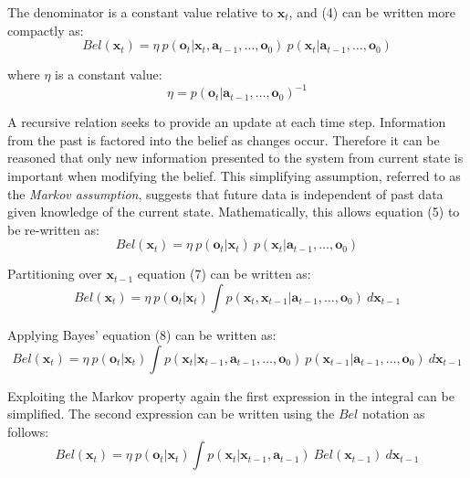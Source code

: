 \documentclass[a4paper]{article}
\begin{document}
The denominator is a constant value relative to $\mathbf{x}_t$, and (4) can be written more compactly as:
\begin{equation}
Bel(\mathbf{x}_t) = \eta \ p(\mathbf{o}_t | \mathbf{x}_t,\mathbf{a}_{t-1},\ldots,\mathbf{o}_0) \ p(\mathbf{x}_t | \mathbf{a}_{t-1},\ldots,\mathbf{o}_0)
\end{equation}

where $\eta$ is a constant value:
\begin{equation}
\eta = p(\mathbf{o}_t | \mathbf{a}_{t-1},\ldots,\mathbf{o}_0)^{-1}
\end{equation}

A recursive relation seeks to provide an update at each time step. Information from the past is factored into the belief as changes occur. Therefore it can be reasoned that only new information presented to the system from current state is important when modifying the belief. This simplifying assumption, referred to as the \textit{Markov assumption}, suggests that future data is independent of past data given knowledge of the current state. Mathematically, this allows equation (5) to be re-written as:
\begin{equation}
Bel(\mathbf{x}_t) = \eta \ p(\mathbf{o}_t | \mathbf{x}_t) \ p(\mathbf{x}_t | \mathbf{a}_{t-1},\ldots,\mathbf{o}_0)
\end{equation} 

Partitioning over $\mathbf{x}_{t-1}$ equation (7) can be written as:
\begin{equation}
Bel(\mathbf{x}_t) = \eta \ p(\mathbf{o}_t | \mathbf{x}_t) \int p(\mathbf{x}_t, \mathbf{x}_{t-1} | \mathbf{a}_{t-1},\ldots,\mathbf{o}_0) \ d\mathbf{x}_{t-1}
\end{equation}

Applying Bayes' equation (8) can be written as:
\begin{equation}
Bel(\mathbf{x}_t) = \eta \ p(\mathbf{o}_t | \mathbf{x}_t) \int p(\mathbf{x}_{t} | \mathbf{x}_{t-1},\mathbf{a}_{t-1},\ldots,\mathbf{o}_0) \ p(\mathbf{x}_{t-1} | \mathbf{a}_{t-1},\ldots,\mathbf{o}_0) \ d\mathbf{x}_{t-1}
\end{equation}

Exploiting the Markov property again the first expression in the integral can be simplified. The second expression can be written using the $Bel$ notation as follows:
\begin{equation}
Bel(\mathbf{x}_t) = \eta \ p(\mathbf{o}_t | \mathbf{x}_t) \int p(\mathbf{x}_{t} | \mathbf{x}_{t-1},\mathbf{a}_{t-1}) \ Bel(\mathbf{x}_{t-1}) \ d\mathbf{x}_{t-1}
\end{equation}
\end{document}

